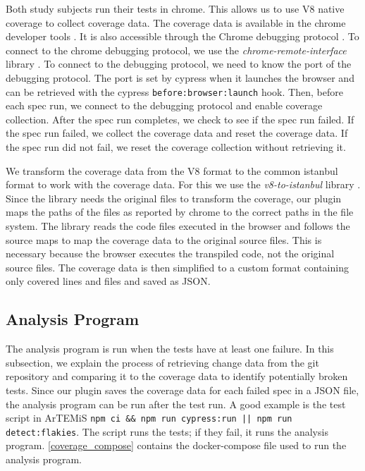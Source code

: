 Both study subjects run their tests in chrome.
This allows us to use V8 native coverage to collect coverage data.
The coverage data is available in the chrome developer tools \autocite{kayce_basques_coverage_2020}.
It is also accessible through the Chrome debugging protocol \autocite{noauthor_chrome_nodate}.
To connect to the chrome debugging protocol, we use the \emph{chrome-remote-interface} library \autocite{cardaci_chrome-remote-interface_2023}.
To connect to the debugging protocol, we need to know the port of the debugging protocol.
The port is set by cypress when it launches the browser and can be retrieved with the cypress \texttt{before:browser:launch} hook.
Then, before each spec run, we connect to the debugging protocol and enable coverage collection.
After the spec run completes, we check to see if the spec run failed.
If the spec run failed, we collect the coverage data and reset the coverage data.
If the spec run did not fail, we reset the coverage collection without retrieving it.

We transform the coverage data from the V8 format to the common istanbul format to work with the coverage data.
For this we use the \emph{v8-to-istanbul} library \autocite{noauthor_v8--istanbul_2023}.
Since the library needs the original files to transform the coverage, our plugin maps the paths of the files as reported by chrome to the correct paths in the file system.
The library reads the code files executed in the browser and follows the source maps to map the coverage data to the original source files.
This is necessary because the browser executes the transpiled code, not the original source files.
The coverage data is then simplified to a custom format containing only covered lines and files and saved as JSON.

\subsection{Analysis Program}
The analysis program is run when the tests have at least one failure.
In this subsection, we explain the process of retrieving change data from the git repository and comparing it to the coverage data to identify potentially broken tests.
Since our plugin saves the coverage data for each failed spec in a JSON file, the analysis program can be run after the test run.
A good example is the test script in ArTEMiS \texttt{npm ci \&\& npm run cypress:run || npm run detect:flakies}. The script runs the tests; if they fail, it runs the analysis program.
\cref{coverage_compose} contains the docker-compose file used to run the analysis program.

